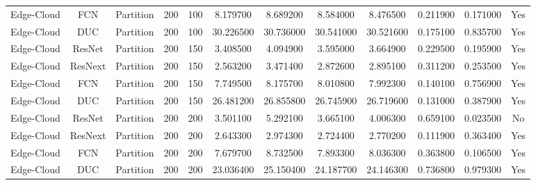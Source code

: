 \begin{tabular}{|c||c||c||c||c||c||c||c||c||c||c||c|}
Edge-Cloud & FCN & Partition & 200 & 100 & 8.179700 & 8.689200 & 8.584000 & 8.476500 & 0.211900 & 0.171000 & Yes \\
Edge-Cloud & DUC & Partition & 200 & 100 & 30.226500 & 30.736000 & 30.541000 & 30.521600 & 0.175100 & 0.835700 & Yes \\
Edge-Cloud & ResNet & Partition & 200 & 150 & 3.408500 & 4.094900 & 3.595000 & 3.664900 & 0.229500 & 0.195900 & Yes \\
Edge-Cloud & ResNext & Partition & 200 & 150 & 2.563200 & 3.471400 & 2.872600 & 2.895100 & 0.311200 & 0.253500 & Yes \\
Edge-Cloud & FCN & Partition & 200 & 150 & 7.749500 & 8.175700 & 8.010800 & 7.992300 & 0.140100 & 0.756900 & Yes \\
Edge-Cloud & DUC & Partition & 200 & 150 & 26.481200 & 26.855800 & 26.745900 & 26.719600 & 0.131000 & 0.387900 & Yes \\
Edge-Cloud & ResNet & Partition & 200 & 200 & 3.501100 & 5.292100 & 3.665100 & 4.006300 & 0.659100 & 0.023500 & No \\
Edge-Cloud & ResNext & Partition & 200 & 200 & 2.643300 & 2.974300 & 2.724400 & 2.770200 & 0.111900 & 0.363400 & Yes \\
Edge-Cloud & FCN & Partition & 200 & 200 & 7.679700 & 8.732500 & 7.893300 & 8.036300 & 0.363800 & 0.106500 & Yes \\
Edge-Cloud & DUC & Partition & 200 & 200 & 23.036400 & 25.150400 & 24.187700 & 24.146300 & 0.736800 & 0.979300 & Yes \\
\bottomrule
\end{tabular}
